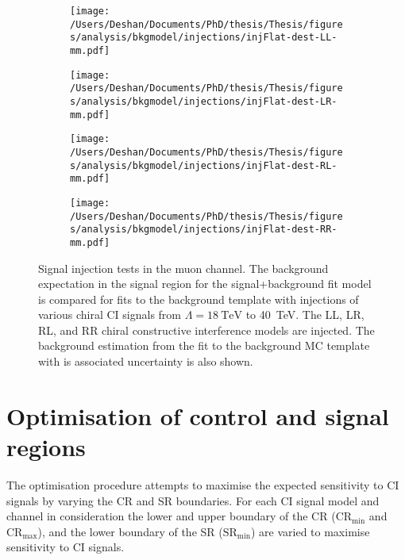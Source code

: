 \begin{figure}[h!]
    \centering
    \begin{subfigure}[b]{0.49\textwidth}
        \centering
        \texttt{[image: /Users/Deshan/Documents/PhD/thesis/Thesis/figures/analysis/bkgmodel/injections/injFlat-dest-LL-mm.pdf]}
        \label{fig:bkgmodel:injmm2}
    \end{subfigure}
    \begin{subfigure}[b]{0.49\textwidth}
        \centering
        \texttt{[image: /Users/Deshan/Documents/PhD/thesis/Thesis/figures/analysis/bkgmodel/injections/injFlat-dest-LR-mm.pdf]}
        \label{fig:bkgmodel:injmm4}
    \end{subfigure}
    \begin{subfigure}[b]{0.49\textwidth}
        \centering
        \texttt{[image: /Users/Deshan/Documents/PhD/thesis/Thesis/figures/analysis/bkgmodel/injections/injFlat-dest-RL-mm.pdf]}
        \label{fig:bkgmodel:injmm6}
    \end{subfigure}
    \begin{subfigure}[b]{0.49\textwidth}
        \centering
        \texttt{[image: /Users/Deshan/Documents/PhD/thesis/Thesis/figures/analysis/bkgmodel/injections/injFlat-dest-RR-mm.pdf]}
        \label{fig:bkgmodel:injmm8}
    \end{subfigure}
    \caption[Signal injection tests in the muon channel for destructive interference models]{Signal injection tests in the muon channel. The background expectation in the signal region for the signal+background fit model is compared for fits to the background template with injections of various chiral CI signals from $\Lambda = \SI{18}{\tera\electronvolt}$ to \SI{40}{\tera\electronvolt}. The LL, LR, RL, and RR chiral constructive interference models are injected. The background estimation from the fit to the background MC template with is associated uncertainty is also shown.}
    \label{fig:bkgmodel:injmmdest}
\end{figure}

\clearpage

\section{Optimisation of control and signal regions}\label{sec:extrap:optimisation}
The optimisation procedure attempts to maximise the expected sensitivity to CI signals by varying the CR and SR boundaries. For each CI signal model and channel in consideration the lower and upper boundary of the CR ($\mathrm{CR}_{\mathrm{min}}$ and $\mathrm{CR}_{\mathrm{max}}$), and the lower boundary of the SR ($\mathrm{SR}_{\mathrm{min}}$) are varied to maximise sensitivity to CI signals. 

